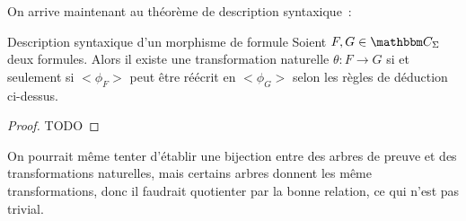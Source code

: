 On arrive maintenant au théorème de description syntaxique~:

\begin{theo}{Description syntaxique d'un morphisme de formule}
    Soient $F,G\in\C_\Sigma$ deux formules. Alors il existe une transformation
    naturelle $\theta:F\rightarrow G$ si et seulement si $<\phi_F>$ peut être réécrit
    en $<\phi_G>$ selon les règles de déduction ci-dessus.
\end{theo}

\begin{proof}
    TODO
\end{proof}

\begin{rem}
    On pourrait même tenter d'établir une bijection entre des arbres de preuve
    et des transformations naturelles, mais certains arbres donnent les même
    transformations, donc il faudrait quotienter par la bonne relation, ce qui
    n'est pas trivial.
\end{rem}


